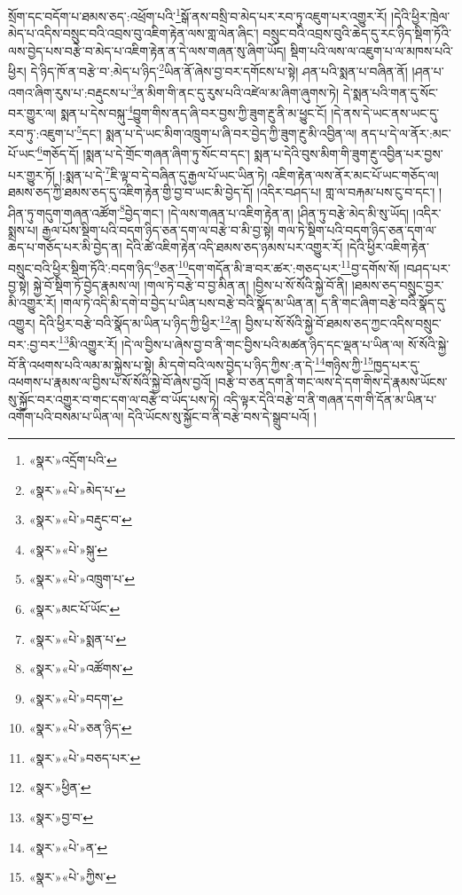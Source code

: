 སྲོག་དང་བདོག་པ་ཐམས་ཅད་:འཕྲོག་པའི་\footnote{«སྣར་»འདྲོག་པའི་}སྒོ་ནས་བསྲི་བ་མེད་པར་རབ་ཏུ་འཇུག་པར་འགྱུར་རོ། །དེའི་ཕྱིར་ཁྲེལ་མེད་པ་འདིས་བསྲུང་བའི་འབྲས་བུ་འཇིག་རྟེན་ལས་གླ་ལེན་ཞིང་། བསྲུང་བའི་འབྲས་བུའི་ཆེད་དུ་རང་ཉིད་སྡིག་ཏོའི་ལས་བྱེད་པས་བརྩེ་བ་མེད་པ་འཇིག་རྟེན་ན་དེ་ལས་གཞན་སུ་ཞིག་ཡོད། སྡིག་པའི་ལས་ལ་འཇུག་པ་ལ་མཁས་པའི་ཕྱིར། དེ་ཉིད་ཁོ་ན་བརྩེ་བ་:མེད་པ་ཉིད་\footnote{«སྣར་»«པེ་»མེད་པ་}ཡིན་ནོ་ཞེས་བྱ་བར་དགོངས་པ་སྟེ། ཤན་པའི་སྨན་པ་བཞིན་ནོ། །ཤན་པ་འགའ་ཞིག་རུས་པ་:བརྡུངས་པ་\footnote{«སྣར་»«པེ་»བརྡུང་བ་}ན་མིག་གི་ནང་དུ་རུས་པའི་འཛེལ་མ་ཞིག་ཞུགས་ཏེ། དེ་སྨན་པའི་གན་དུ་སོང་བར་གྱུར་ལ། སྨན་པ་དེས་བསྐུ་\footnote{«སྣར་»«པེ་»སྐུ་}བྱུག་གིས་ནད་ཞི་བར་བྱས་ཀྱི་ཟུག་རྔུ་ནི་མ་ཕྱུང་ངོ། །དེ་ནས་དེ་ཡང་ནས་ཡང་དུ་རབ་ཏུ་:འཇུག་པ་\footnote{«སྣར་»«པེ་»འཁྲུག་པ་}དང་། སྨན་པ་དེ་ཡང་མིག་འཁྲུག་པ་ཞི་བར་བྱེད་ཀྱི་ཟུག་རྔུ་མི་འབྱིན་ལ། ནད་པ་དེ་ལ་ནོར་:མང་པོ་ཡང་\footnote{«སྣར་»མང་པོ་ཡོང་}གཅོད་དོ། །སྨན་པ་དེ་གྲོང་གཞན་ཞིག་ཏུ་སོང་བ་དང་། སྨན་པ་དེའི་བུས་མིག་གི་ཟུག་རྔུ་འབྱིན་པར་བྱས་པར་གྱུར་ཏོ། །:སྨན་པ་དེ་\footnote{«སྣར་»«པེ་»སྨན་པ་}ཇི་ལྟ་བ་དེ་བཞིན་དུ་རྒྱལ་པོ་ཡང་ཡིན་ཏེ། འཇིག་རྟེན་ལས་ནོར་མང་པོ་ཡང་གཅོད་ལ། ཐམས་ཅད་ཀྱི་ཐམས་ཅད་དུ་འཇིག་རྟེན་གྱི་བྱ་བ་ཡང་མི་བྱེད་དོ། །འདིར་བཤད་པ། གླ་ལ་བརྐམ་པས་ངུ་བ་དང་། །ཤིན་ཏུ་གདུག་གཞན་འཚོག་\footnote{«སྣར་»«པེ་»འཚོགས་}བྱེད་གང་། །དེ་ལས་གཞན་པ་འཇིག་རྟེན་ན། །ཤིན་ཏུ་བརྩེ་མེད་མི་སུ་ཡོད། །འདིར་སྨྲས་པ། རྒྱལ་པོས་སྡིག་པའི་བདག་ཉིད་ཅན་དག་ལ་བརྩེ་བ་མི་བྱ་སྟེ། གལ་ཏེ་སྡིག་པའི་བདག་ཉིད་ཅན་དག་ལ་ཆད་པ་གཅོད་པར་མི་བྱེད་ན། དེའི་ཚེ་འཇིག་རྟེན་འདི་ཐམས་ཅད་ཉམས་པར་འགྱུར་རོ། །དེའི་ཕྱིར་འཇིག་རྟེན་བསྲུང་བའི་ཕྱིར་སྡིག་ཏོའི་:བདག་ཉིད་\footnote{«སྣར་»«པེ་»བདག་}ཅན་\footnote{«སྣར་»«པེ་»ཅན་ཉིད་}དག་གདོན་མི་ཟ་བར་ཚར་:གཅད་པར་\footnote{«སྣར་»«པེ་»བཅད་པར་}བྱ་དགོས་སོ། །བཤད་པར་བྱ་སྟེ། སྐྱེ་བོ་སྡིག་ཏོ་བྱེད་རྣམས་ལ། །གལ་ཏེ་བརྩེ་བ་བྱ་མིན་ན། །བྱིས་པ་སོ་སོའི་སྐྱེ་བོ་ནི། །ཐམས་ཅད་བསྲུང་བྱར་མི་འགྱུར་རོ། །གལ་ཏེ་འདི་མི་དགེ་བ་བྱེད་པ་ཡིན་པས་བརྩེ་བའི་སྣོད་མ་ཡིན་ན། ད་ནི་གང་ཞིག་བརྩེ་བའི་སྣོད་དུ་འགྱུར། དེའི་ཕྱིར་བརྩེ་བའི་སྣོད་མ་ཡིན་པ་ཉིད་ཀྱི་ཕྱིར་\footnote{«སྣར་»ཕྱིན་}ན། བྱིས་པ་སོ་སོའི་སྐྱེ་བོ་ཐམས་ཅད་ཀྱང་འདིས་བསྲུང་བར་:བྱ་བར་\footnote{«སྣར་»བྱ་བ་}མི་འགྱུར་རོ། །དེ་ལ་བྱིས་པ་ཞེས་བྱ་བ་ནི་གང་བྱིས་པའི་མཚན་ཉིད་དང་ལྡན་པ་ཡིན་ལ། སོ་སོའི་སྐྱེ་བོ་ནི་འཕགས་པའི་ལམ་མ་སྐྱེས་པ་སྟེ། མི་དགེ་བའི་ལས་བྱེད་པ་ཉིད་ཀྱིས་:ན་དེ་\footnote{«སྣར་»«པེ་»ན་}གཉིས་ཀྱི་\footnote{«སྣར་»«པེ་»ཀྱིས་}ཁྱད་པར་དུ་འཕགས་པ་རྣམས་ལ་བྱིས་པ་སོ་སོའི་སྐྱེ་བོ་ཞེས་བྱའོ། །བརྩེ་བ་ཅན་དག་ནི་གང་ལས་དེ་དག་གིས་དེ་རྣམས་ཡོངས་སུ་སྐྱོང་བར་འགྱུར་བ་གང་དག་ལ་བརྩེ་བ་ཡོད་པས་ཏེ། འདི་ལྟར་དེའི་བརྩེ་བ་ནི་གཞན་དག་གི་དོན་མ་ཡིན་པ་འགོག་པའི་བསམ་པ་ཡིན་ལ། དེའི་ཡོངས་སུ་སྐྱོང་བ་ནི་བརྩེ་བས་དེ་སྒྲུབ་པའོ། །

